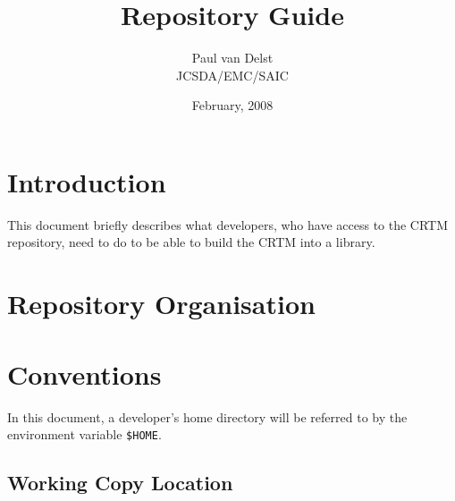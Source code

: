 

\title{Repository Guide}
\author{Paul van Delst\\JCSDA/EMC/SAIC}
\date{February, 2008}



\maketitle


\section{Introduction}
This document briefly describes what developers, who have access to the CRTM repository, need to do to be able to build the CRTM into a library. 

\section{Repository Organisation}

\section{Conventions}
In this document, a developer's home directory will be referred to by the environment variable \texttt{\$HOME}.

\subsection{Working Copy Location}





